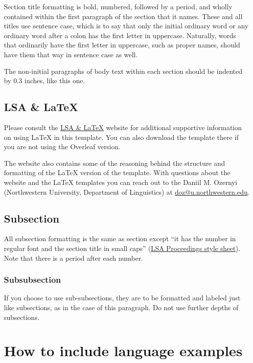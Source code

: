 \documentclass[12pt,letterpaper]{article}
\begin{document}
Section title formatting is bold, numbered, followed by a period, and wholly contained within the first paragraph of the section that it names. These and all titles use sentence case, which is to say that only the initial ordinary word or any ordinary word after a colon has the first letter in uppercase. Naturally, words that ordinarily have the first letter in uppercase, such as proper names, should have them that way in sentence case as well.

The non-initial paragraphs of body text within each section should be indented by 0.3 inches, like this one.


\subsection{LSA \& \LaTeX{}}
Please consult the \href{https://dozernyi.gitlab.io/lsalatex/}{LSA \& \LaTeX{}} website for additional supportive information on using \LaTeX{} in this template. You can also download the template there if you are not using the Overleaf version. 

The website also contains some of the reasoning behind the structure and formatting of the \LaTeX{} version of the template. With questions about the website and the \LaTeX{} templates you can reach out to the Daniil M. Ozernyi (Northwestern University, Department of Linguistics) at \href{mailto:doz@u.northwestrn.edu}{doz@u.northwestern.edu}.

 
\subsection{Subsection} 
All subsection formatting is the same as section except ``it has the number in regular font and the section title in small caps'' (\href{https://journals.linguisticsociety.org/proceedings/index.php/PLSA/about/submissions}{LSA Proceedings style sheet}). Note that there is a period after each number.

\subsubsection{Subsubsection}
If you choose to use sub-subsections, they are to be formatted and labeled just like subsections, as in the case of this paragraph. Do not use further depths of subsections.

\section{How to include language examples}
\end{document}
